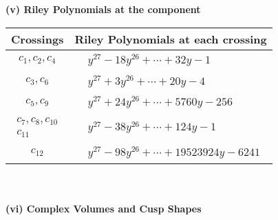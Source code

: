 \documentclass[1p]{elsarticle_modified}
\theoremstyle{definition}
\begin{document}
\flushleft \textbf{(v) Riley Polynomials at the component}\newline \\
\begin{tabular}{m{50pt}|m{274pt}}
Crossings & \hspace{64pt}Riley Polynomials at each crossing \\
\hline $$\begin{aligned}c_{1},c_{2},c_{4}\end{aligned}$$&$\begin{aligned}
&y^{27}-18 y^{26}+\cdots+32 y-1
\end{aligned}$\\
\hline $$\begin{aligned}c_{3},c_{6}\end{aligned}$$&$\begin{aligned}
&y^{27}+3 y^{26}+\cdots+20 y-4
\end{aligned}$\\
\hline $$\begin{aligned}c_{5},c_{9}\end{aligned}$$&$\begin{aligned}
&y^{27}+24 y^{26}+\cdots+5760 y-256
\end{aligned}$\\
\hline $$\begin{aligned}c_{7},c_{8},c_{10}\\c_{11}\end{aligned}$$&$\begin{aligned}
&y^{27}-38 y^{26}+\cdots+124 y-1
\end{aligned}$\\
\hline $$\begin{aligned}c_{12}\end{aligned}$$&$\begin{aligned}
&y^{27}-98 y^{26}+\cdots+19523924 y-6241
\end{aligned}$\\
\hline
\end{tabular}\\~\\
\newpage\flushleft \textbf{(vi) Complex Volumes and Cusp Shapes}
\end{document}
